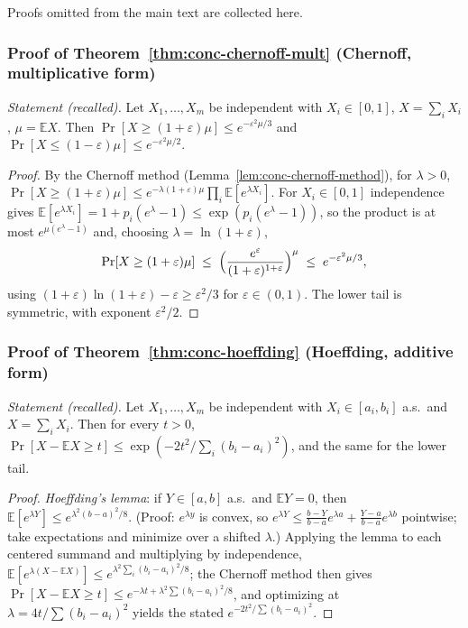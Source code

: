 Proofs omitted from the main text are collected here.

\subsubsection*{Proof of Theorem~\ref{thm:conc-chernoff-mult} (Chernoff, multiplicative form)}
{\itshape Statement (recalled).} Let $X_1,\dots,X_m$ be independent with
$X_i \in [0,1]$, $X = \sum_i X_i$, $\mu = \mathbb{E}X$. Then
$\Pr[X \ge (1+\varepsilon)\mu] \le e^{-\varepsilon^2\mu/3}$ and
$\Pr[X \le (1-\varepsilon)\mu] \le e^{-\varepsilon^2\mu/2}$.\eop

\begin{proof}
By the Chernoff method (Lemma~\ref{lem:conc-chernoff-method}), for $\lambda > 0$,
$\Pr[X \ge (1+\varepsilon)\mu] \le e^{-\lambda(1+\varepsilon)\mu}
\prod_i \mathbb{E}[e^{\lambda X_i}]$. For $X_i \in [0,1]$ independence gives
$\mathbb{E}[e^{\lambda X_i}] = 1 + p_i(e^{\lambda}-1) \le
\exp(p_i(e^{\lambda}-1))$, so the product is at most $e^{\mu(e^\lambda - 1)}$ and,
choosing $\lambda = \ln(1+\varepsilon)$,
\[
\Pr[X \ge (1+\varepsilon)\mu] \;\le\;
\Bigl(\frac{e^{\varepsilon}}{(1+\varepsilon)^{1+\varepsilon}}\Bigr)^{\mu}
\;\le\; e^{-\varepsilon^2\mu/3},
\]
using $(1+\varepsilon)\ln(1+\varepsilon) - \varepsilon \ge \varepsilon^2/3$ for
$\varepsilon \in (0,1)$. The lower tail is symmetric, with exponent
$\varepsilon^2/2$.
\end{proof}

\subsubsection*{Proof of Theorem~\ref{thm:conc-hoeffding} (Hoeffding, additive form)}
{\itshape Statement (recalled).} Let $X_1,\dots,X_m$ be independent with
$X_i \in [a_i,b_i]$ a.s.\ and $X = \sum_i X_i$. Then for every $t > 0$,
$\Pr[X - \mathbb{E}X \ge t] \le \exp(-2t^2/\sum_i (b_i-a_i)^2)$, and the same for the
lower tail.\eop

\begin{proof}
\emph{Hoeffding's lemma}: if $Y \in [a,b]$ a.s.\ and $\mathbb{E}Y = 0$, then
$\mathbb{E}[e^{\lambda Y}] \le e^{\lambda^2(b-a)^2/8}$. (Proof: $e^{\lambda y}$ is
convex, so $e^{\lambda Y} \le \frac{b-Y}{b-a}e^{\lambda a} + \frac{Y-a}{b-a}e^{\lambda
b}$ pointwise; take expectations and minimize over a shifted $\lambda$.) Applying the
lemma to each centered summand and multiplying by independence,
$\mathbb{E}[e^{\lambda(X - \mathbb{E}X)}] \le e^{\lambda^2 \sum_i (b_i-a_i)^2/8}$; the
Chernoff method then gives
$\Pr[X - \mathbb{E}X \ge t] \le e^{-\lambda t + \lambda^2\sum(b_i-a_i)^2/8}$, and
optimizing at $\lambda = 4t/\sum(b_i-a_i)^2$ yields the stated
$e^{-2t^2/\sum(b_i-a_i)^2}$.
\end{proof}

